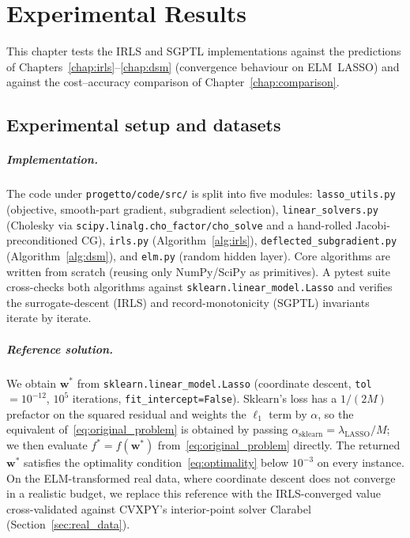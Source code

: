 \chapter{Experimental Results}
\label{chap:results}

This chapter tests the IRLS and SGPTL implementations against the
predictions of Chapters~\ref{chap:irls}--\ref{chap:dsm} (convergence
behaviour on ELM~LASSO) and against the cost--accuracy comparison of
Chapter~\ref{chap:comparison}.

\section{Experimental setup and datasets}
\label{sec:setup}

\paragraph{Implementation.}
The code under \texttt{progetto/code/src/} is split into five modules:
\texttt{lasso\_utils.py} (objective, smooth-part gradient, subgradient
selection), \texttt{linear\_}\allowbreak\texttt{solvers.py} (Cholesky via
\texttt{scipy.linalg.cho\_factor/}\allowbreak\texttt{cho\_solve} and a
hand-rolled Jacobi-preconditioned CG), \texttt{irls.py}
(Algorithm~\ref{alg:irls}),
\texttt{deflected\_}\allowbreak\texttt{subgradient.py}
(Algorithm~\ref{alg:dsm}), and \texttt{elm.py} (random hidden layer).
Core algorithms are written from scratch (reusing only NumPy/SciPy as
primitives). A pytest suite cross-checks both algorithms against
\texttt{sklearn.linear\_}\allowbreak\texttt{model.Lasso} and verifies the
surrogate-descent (IRLS) and record-monotonicity (SGPTL) invariants
iterate by iterate.

\paragraph{Reference solution.}
We obtain $\mathbf{w}^{*}$ from
\texttt{sklearn.linear\_}\allowbreak\texttt{model.Lasso} (coordinate
descent, \texttt{tol}$=10^{-12}$, $10^{5}$ iterations,
\texttt{fit\_intercept=False}). Sklearn's loss has a $1/(2M)$ prefactor on the squared residual and
weights the $\ell_{1}$ term by $\alpha$, so the equivalent
of~\eqref{eq:original_problem} is obtained by passing
$\alpha_\text{sklearn} = \lambda_\text{LASSO}/M$; we then evaluate
$f^{*} = f(\mathbf{w}^{*})$ from~\eqref{eq:original_problem} directly. The returned
$\mathbf{w}^{*}$ satisfies the optimality
condition~\eqref{eq:optimality} below $10^{-3}$ on every instance. On the
ELM-transformed real data, where coordinate descent does not converge in
a realistic budget, we replace this reference with the IRLS-converged
value cross-validated against CVXPY's interior-point solver Clarabel
(Section~\ref{sec:real_data}).


